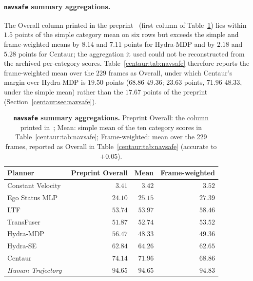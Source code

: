 \paragraph{\texttt{navsafe} summary aggregations.} The Overall column printed in the preprint~\cite{sima2024centaur} (first column of Table~\ref{centaur:tab:navsafe_overall}) lies within $1.5$ points of the simple category mean on six rows but exceeds the simple and frame-weighted means by $8.14$ and $7.11$ points for Hydra-MDP and by $2.18$ and $5.28$ points for Centaur; the aggregation it used could not be reconstructed from the archived per-category scores. Table~\ref{centaur:tab:navsafe} therefore reports the frame-weighted mean over the $229$ frames as Overall, under which Centaur's margin over Hydra-MDP is $19.50$ points ($68.86$ \vs $49.36$; $23.63$ points, $71.96$ \vs $48.33$, under the simple mean) rather than the $17.67$ points of the preprint (Section~\ref{centaur:sec:navsafe}).

\begin{table}[htb]
  \centering
  \caption[\texttt{navsafe} summary aggregations]{\textbf{\texttt{navsafe} summary aggregations.} Preprint Overall: the column printed in~\cite{sima2024centaur}; Mean: simple mean of the ten category scores in Table~\ref{centaur:tab:navsafe}; Frame-weighted: mean over the 229 frames, reported as Overall in Table~\ref{centaur:tab:navsafe} (accurate to $\pm 0.05$).}
  \label{centaur:tab:navsafe_overall}
  \begin{tabular}{l|r|rr}
    \toprule
    \textbf{Planner} & \textbf{Preprint Overall} & \textbf{Mean} & \textbf{Frame-weighted} \\
    \midrule
    Constant Velocity~\cite{dauner2024navsim} & $3.41$ & $3.42$ & $3.52$ \\
    Ego Status MLP~\cite{dauner2024navsim} & $24.10$ & $25.15$ & $27.39$ \\
    LTF~\cite{chitta2023transfuser} & $53.74$ & $53.97$ & $58.46$ \\
    TransFuser~\cite{chitta2023transfuser} & $51.87$ & $52.74$ & $53.52$ \\
    Hydra-MDP~\cite{li2024hydramdp} & $56.47$ & $48.33$ & $49.36$ \\
    \midrule
    Hydra-SE & $62.84$ & $64.26$ & $62.65$ \\
    Centaur & $74.14$ & $71.96$ & $68.86$ \\
    \midrule
    \textit{Human Trajectory} & $\mathit{94.65}$ & $\mathit{94.65}$ & $\mathit{94.83}$ \\
    \bottomrule
  \end{tabular}
\end{table}

